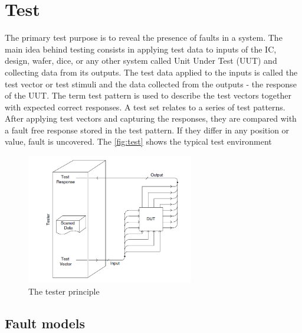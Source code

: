 \chapter{Test}\label{ch:test}
The primary test purpose is to reveal the presence of faults in a system. The main idea behind testing consists in applying test data to inputs of the IC, design, wafer, dice, or any other system called Unit Under Test (UUT) and collecting data from its outputs. The test data applied to the inputs is called the test vector or test stimuli and the data collected from the outputs - the response of the UUT. The term test pattern is used to describe the test vectors together with expected correct responses. A test set relates to a series of test patterns. After applying test vectors and capturing the responses, they are compared with a fault free response stored in the test pattern. If they differ in any position or value, fault is uncovered. The \autoref{fig:test} shows the typical test environment

\begin{figure}[H]
\centering
\includegraphics[width=0.65\textwidth]{figures/test.png}
\caption{The tester principle~\cite{book:Navabi}}
\label{fig:test}
\end{figure}


\section{Fault models}


